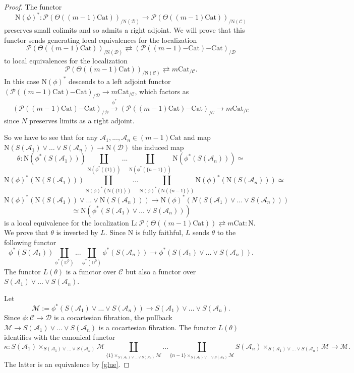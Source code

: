 \documentclass[10pt,oneside]{article}
\numberwithin{equation}{section} %
\numberwithin{figure}{section} %
\theoremstyle{plain}
\theoremstyle{definition}
\newcommand{\bD}{{\mathbb D}}
\newcommand{\mA}{{\mathcal A}}
\newcommand{\mC}{{\mathcal C}}
\newcommand{\mD}{{\mathcal D}}
\newcommand{\mM}{{\mathcal M}}
\newcommand{\mP}{{\mathcal P}}
\renewcommand{\L}{{\mathrm L}}
\newcommand{\N}{{\mathrm N}}
\newcommand{\Cat}{\mathrm{Cat}}
\begin{document}
\begin{proof}
The functor $$\N(\phi)^*: \mP(\Theta((m-1)\Cat))_{/\N(\mD)} \to \mP(\Theta((m-1)\Cat))_{/\N(\mC)} $$ preserves small colimits
and so admits a right adjoint.
We will prove that this functor sends generating local equivalences
for the localization $$\mP(\Theta((m-1)\Cat))_{/\N(\mD)} \rightleftarrows ({{\mP((m-1)\mathrm{-}\Cat)}\mathrm{-}\Cat})_{/\mD}$$ to local equivalences for the
localization $$\mP(\Theta((m-1)\Cat))_{/\N(\mC)} \rightleftarrows m\Cat_{/\mC}.$$
In this case $\N(\phi)^*$ descends to a left adjoint functor 
$({\mP((m-1)\Cat)}\mathrm{-}\Cat)_{/\mD} \to {m\Cat}_{/\mC} $, 
which factors as $$({\mP((m-1)\Cat)}\mathrm{-}\Cat)_{/\mD} \xrightarrow{\phi^*}({\mP((m-1)\Cat)}\mathrm{-}\Cat)_{/\mC} \to {m\Cat}_{/\mC} $$
since $N$ preserves limits as a right adjoint.

So we have to see that for any $\mA_1,..., \mA_n \in (m-1)\Cat $ and map
$ \N(S(\mA_1) \vee \ldots \vee S(\mA_n)) \to \N(\mD)$
the induced map
$$ \theta: \N(\phi^*(S(\mA_1))) \coprod_{\N(\phi^*(\{1\} ))} ... \coprod_{\N(\phi^*(\{n-1\}))} \N(\phi^*(S(\mA_n))) \simeq $$ 
$$\N(\phi)^*(\N(S(\mA_1))) \coprod_{\N(\phi)^*(\N(\{1\}))} ... \coprod_{\N(\phi)^*(\N(\{n-1\}))} \N(\phi)^*(\N(S(\mA_n))) \simeq $$$$ \N(\phi)^*(\N(S(\mA_1)) \vee ... \vee \N(S(\mA_n))) \to \N(\phi)^*(N(S(\mA_1) \vee \ldots \vee S(\mA_n)))$$$$ \simeq \N(\phi^*(S(\mA_1) \vee \ldots \vee S(\mA_n))) $$
is a local equivalence for the localization $\L: \mP(\Theta((m-1)\Cat)) \rightleftarrows m\Cat: \N$. We prove that $\theta$ is inverted by $L$.
Since $\N$ is fully faithful, $L$  sends $\theta$ to the following functor
$$ \phi^*(S(\mA_1)) \coprod_{\phi^*(\bD^0)} ... \coprod_{\phi^*(\bD^0)} \phi^*(S(\mA_n)) \to \phi^*(S(\mA_1) \vee \ldots \vee S(\mA_n)).$$
The functor $L(\theta)$ is a functor over $\mC$ but also a functor over $S(\mA_1) \vee \ldots \vee S(\mA_n).$

Let $$ \mM := \phi^*(S(\mA_1) \vee \ldots \vee S(\mA_n)) \to S(\mA_1) \vee \ldots \vee S(\mA_n). $$
Since $\phi: \mC \to \mD$ is a cocartesian fibration,
the pullback $\mM \to S(\mA_1) \vee \ldots \vee S(\mA_n)$
is a cocartesian fibration.
The functor $L(\theta)$ identifies with the canonical functor
$$ \kappa: S(\mA_1) \times_{S(\mA_1) \vee \ldots \vee S(\mA_n)} \mM \coprod_{\{1\} \times_{S(\mA_1) \vee \ldots \vee S(\mA_n)} \mM} ... \coprod_{\{n-1\} \times_{S(\mA_1) \vee \ldots \vee S(\mA_n)} \mM} S(\mA_n) \times_{S(\mA_1) \vee \ldots \vee S(\mA_n)} \mM \to \mM.$$ 
The latter is an equivalence by \cref{glue}.
\end{proof}
\end{document}

